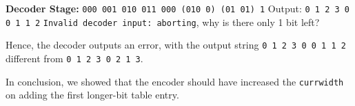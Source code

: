 \documentclass[12pt]{article}
\begin{document}
\textbf{Decoder Stage:} \texttt{000 001 010 011 000 (010 0) (01 01) {\color{red}1}}
\newline Output: \texttt{0 1 2 3 0 0 1 1 2}
\newline \texttt{Invalid decoder input: aborting}, why is there only 1 bit left?

Hence, the decoder outputs an error, with the output string \texttt{0 1 2 3 0 0 1 1 2} different from \texttt{0 1 2 3 0 2 1 3}.

In conclusion, we showed that the encoder should have increased the \texttt{currwidth} on adding the first longer-bit table entry.


\newpage
\section{}

\newpage
\section{}

\newpage
\section{}
\end{document}
